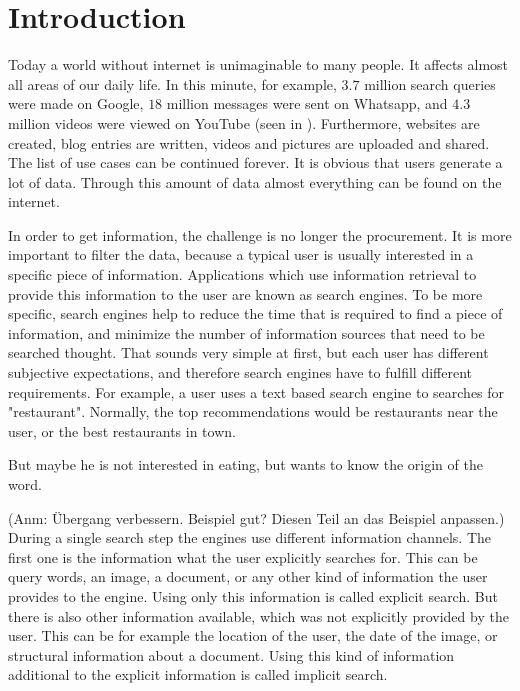 \chapter{Introduction}
\label{cha:introduction}

Today a world without internet is unimaginable to many people. It affects almost all areas of our daily life. In this minute, for example, $3.7$ million search queries were made on Google, $18$ million messages were sent on Whatsapp, and $4.3$ million videos were viewed on YouTube (seen in ). Furthermore, websites are created, blog entries are written, videos and pictures are uploaded and shared. The list of use cases can be continued forever. It is obvious that users generate a lot of data. Through this amount of data almost everything can be found on the internet.

In order to get information, the challenge is no longer the procurement. It is more important to filter the data, because a typical user is usually interested in a specific piece of information. Applications which use information retrieval to provide this information to the user are known as search engines. To be more specific, search engines help to reduce the time that is required to find a piece of information, and minimize the number of information sources that need to be searched thought. That sounds very simple at first, but each user has different subjective expectations, and therefore search engines have to fulfill different requirements. For example, a user uses a text based search engine to searches for "restaurant". Normally, the top recommendations would be restaurants near the user, or the best restaurants in town.


But maybe he is not interested in eating, but wants to know the origin of the word. %

(Anm: Übergang verbessern. Beispiel gut? Diesen Teil an das Beispiel anpassen.) During a single search step the engines use different information channels. The first one is the information what the user explicitly searches for. This can be query words, an image, a document, or any other kind of information the user provides to the engine. Using only this information is called explicit search. But there is also other information available, which was not explicitly provided by the user. This can be for example the location of the user, the date of the image, or structural information about a document. Using this kind of information additional to the explicit information is called implicit search. %

